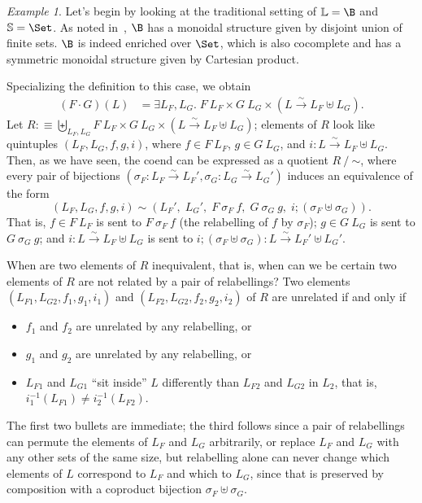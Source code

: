 \documentclass[preprint,authoryear]{sigplanconf}
\newcommand{\pref}[1]{\prettyref{#1}}
\newcommand{\bbb}[1]{\ensuremath{\mathbb{#1}}\xspace}
\newcommand{\exist}[1]{\exists #1.\;}
\newcommand{\bij}{\stackrel{\sim}{\longrightarrow}}
\let\oldequiv\equiv
\newcommand{\jeq}{\oldequiv}          %
\newcommand{\defeq}{\mathrel{:\jeq}}  %
\renewcommand{\equiv}{\simeq}         %
\newcommand{\quotient}[2]{#1 \mathbin{/} \mathord{#2}}
\theoremstyle{definition}
\theoremstyle{remark}
\newtheorem*{ex}{Example}
\newcommand{\then}{\mathbin{;}}                       %
\newcommand{\coend}[1]{\exist{#1}}
\newcommand{\Lab}{\bbb{L}}
\newcommand{\Str}{\bbb{S}}
\begin{document}
\begin{ex}
  Let's begin by looking at the traditional setting of $\Lab = \B$ and
  $\Str = \Set$.  As noted in~\pref{sec:groupoids}, $\B$ has a
  monoidal structure given by disjoint union of finite sets. $\B$ is
  indeed enriched over $\Set$, which is also cocomplete and has a
  symmetric monoidal structure given by Cartesian product.

  Specializing the definition to this case, we obtain
  \begin{align*}
    (F \cdot G)(L) &= \coend{L_F, L_G} F\ L_F \times G\ L_G \times
    (L \bij L_F \uplus L_G).
  \end{align*}
  Let $R \defeq \biguplus_{L_F, L_G} F\ L_F \times G\ L_G \times (L
  \bij L_F \uplus L_G)$; elements of $R$ look like quintuples $(L_F, L_G,
  f, g, i)$, where $f \in F\ L_F$, $g \in G\ L_G$, and $i : L \bij L_F
  \uplus L_G$.  Then, as we have seen, the coend can be expressed as a
  quotient $\quotient{R}{\sim}$, where every pair of bijections
  $(\sigma_F : L_F \bij L_F', \sigma_G : L_G \bij L_G')$ induces an
  equivalence of the form \[ (L_F, L_G, f, g, i) \sim (L_F',\; L_G',\;
  F\ \sigma_F\ f,\; G\ \sigma_G\ g,\; i \then (\sigma_F \uplus
  \sigma_G)). \] That is, $f \in F\ L_F$ is sent to $F\ \sigma_F\ f$
  (the relabelling of $f$ by $\sigma_F$); $g \in G\ L_G$ is sent to
  $G\ \sigma_G\ g$; and $i : L \bij L_F \uplus L_G$ is sent to $i ;
  (\sigma_F \uplus \sigma_G) : L \bij L_F' \uplus L_G'$.

  When are two elements of $R$ inequivalent, that is, when can we be
  certain two elements of $R$ are not related by a pair of
  relabellings?  Two elements $(L_{F1}, L_{G2}, f_1, g_1, i_1)$ and
  $(L_{F2},L_{G2},f_2,g_2,i_2)$ of $R$ are unrelated if and only if
  \begin{itemize}
  \item $f_1$ and $f_2$ are unrelated by any relabelling, or
  \item $g_1$ and $g_2$ are unrelated by any relabelling, or
  \item $L_{F1}$ and $L_{G1}$ ``sit inside'' $L$ differently than $L_{F2}$ and
    $L_{G2}$ in $L_2$, that is, $i_1^{-1}(L_{F1}) \neq i_2^{-1}(L_{F2})$.
  \end{itemize}
  The first two bullets are immediate; the third follows since a pair
  of relabellings can permute the elements of $L_F$ and $L_G$
  arbitrarily, or replace $L_F$ and $L_G$ with any other sets of the
  same size, but relabelling alone can never change which elements of
  $L$ correspond to $L_F$ and which to $L_G$, since that is preserved
  by composition with a coproduct bijection $\sigma_F \uplus \sigma_G$.


\end{ex}
\end{document}
